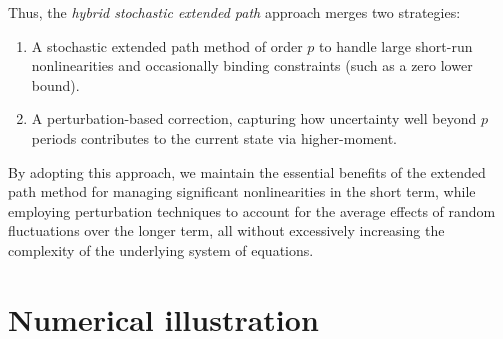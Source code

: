 \documentclass[a4paper,11pt]{amsart}
\begin{document}
Thus, the \emph{hybrid stochastic extended path} approach merges two strategies:\newline
\begin{enumerate}
   \item A stochastic extended path method of order $p$ to handle large short-run
         nonlinearities and occasionally binding constraints (such as a zero lower bound).\newline
   \item A perturbation-based correction, capturing how uncertainty well beyond
         $p$ periods contributes to the current state via higher-moment.\newline
\end{enumerate}

By adopting this approach, we maintain the essential benefits of the
extended path method for managing significant nonlinearities in the
short term, while employing perturbation techniques to account for the
average effects of random fluctuations over the longer term, all
without excessively increasing the complexity of the underlying system
of equations.

\section{Numerical illustration}\label{sec:3}
\end{document}
